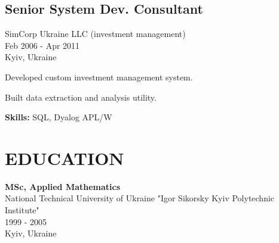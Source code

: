 \documentclass[a4paper,10pt]{article}
\begin{document}
\subsection*{Senior System Dev. Consultant}
SimCorp Ukraine LLC (investment management) \\
Feb 2006 - Apr 2011 \\
Kyiv, Ukraine
\begin{bulletlist}
    \item Developed custom investment management system.
    \item Built data extraction and analysis utility.
\end{bulletlist}
\textbf{Skills:} SQL, Dyalog APL/W

\section*{EDUCATION}
\textbf{MSc, Applied Mathematics} \\
National Technical University of Ukraine "Igor Sikorsky Kyiv Polytechnic Institute" \\
1999 - 2005 \\
Kyiv, Ukraine
\end{document}
